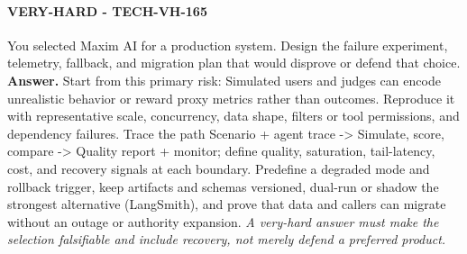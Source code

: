 \paragraph{VERY-HARD - TECH-VH-165} You selected Maxim AI for a production system. Design the failure experiment, telemetry, fallback, and migration plan that would disprove or defend that choice.
\textbf{Answer.} Start from this primary risk: Simulated users and judges can encode unrealistic behavior or reward proxy metrics rather than outcomes. Reproduce it with representative scale, concurrency, data shape, filters or tool permissions, and dependency failures. Trace the path Scenario + agent trace -> Simulate, score, compare -> Quality report + monitor; define quality, saturation, tail-latency, cost, and recovery signals at each boundary. Predefine a degraded mode and rollback trigger, keep artifacts and schemas versioned, dual-run or shadow the strongest alternative (LangSmith), and prove that data and callers can migrate without an outage or authority expansion.
\textit{A very-hard answer must make the selection falsifiable and include recovery, not merely defend a preferred product.}

